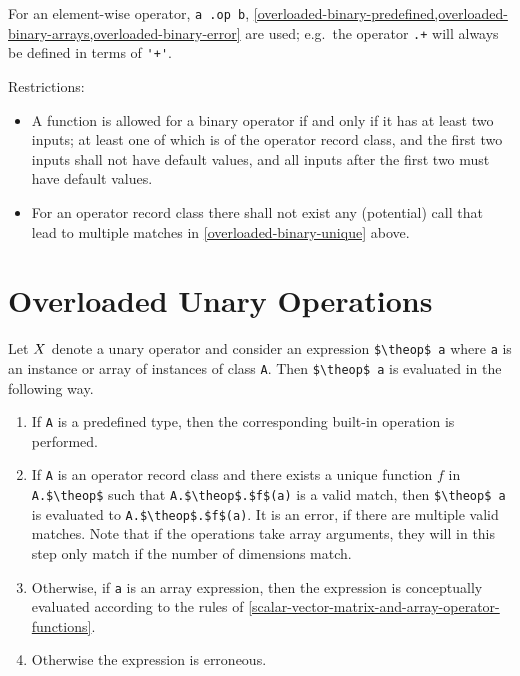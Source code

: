 For an element-wise operator, \lstinline!a .op b!, \cref{overloaded-binary-predefined,overloaded-binary-arrays,overloaded-binary-error} are used; e.g.\ the operator \lstinline!.+! will always be defined in terms of \lstinline!'+'!.

Restrictions:
\begin{itemize}
\item
  A function is allowed for a binary operator if and only if it has at least two inputs; at least one of which is of the operator record class, and the first two inputs shall not have default values, and all inputs after the first two must have default values.
\item
  For an operator record class there shall not exist any (potential) call that lead to multiple matches in \cref{overloaded-binary-unique} above.
\end{itemize}

\section{Overloaded Unary Operations}\label{overloaded-unary-operations}

Let $X$ denote a unary operator and consider an expression \lstinline!$\theop$ a! where \lstinline!a! is an instance or array of instances of class \lstinline!A!.
Then \lstinline!$\theop$ a! is evaluated in the following way.

\begin{enumerate}
\item
  If \lstinline!A! is a predefined type, then the corresponding built-in operation is performed.
\item\label{unary-operator-record-unique-match}
  If \lstinline!A! is an operator record class and there exists a unique function $f$ in \lstinline!A.$\theop$! such that \lstinline!A.$\theop$.$f$(a)! is a valid match, then \lstinline!$\theop$ a! is evaluated to \lstinline!A.$\theop$.$f$(a)!.
  It is an error, if there are multiple valid matches.
  Note that if the operations take array arguments, they will in this step only match if the number of dimensions match.
\item\label{overloaded-unary-array}
  Otherwise, if \lstinline!a! is an array expression, then the expression is conceptually evaluated according to the rules of \cref{scalar-vector-matrix-and-array-operator-functions}.
\item
  Otherwise the expression is erroneous.
\end{enumerate}

